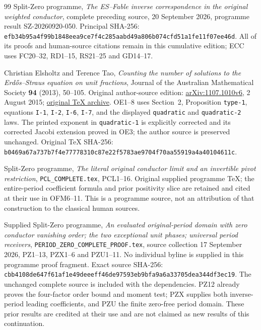\documentclass[11pt]{article}
\begin{document}
\begin{thebibliography}{99}
 Split-Zero programme,
\emph{The ES--Fable inverse correspondence in the original weighted
conductor}, complete preceding source, 20 September 2026,
programme result SZ-20260920-050. Principal SHA-256:
\texttt{efb34b95a4f99b1848eea9ce7f4c285aabd49a806b074cfd51a1fe11f07ee46d}.
All of its proofs and human-source citations remain in this cumulative
edition; ECC uses FC20--32, RD1--15, RS21--25 and GD14--17.


 Christian Elsholtz and Terence Tao,
\emph{Counting the number of solutions to the Erd\H{o}s--Straus
equation on unit fractions}, Journal of the Australian Mathematical
Society \textbf{94} (2013), 50--105. Original author-source edition:
\href{https://arxiv.org/abs/1107.1010v6}{arXiv:1107.1010v6},
2 August 2015; \href{https://arxiv.org/src/1107.1010v6}{original TeX archive}.
OE1--8 uses Section~2, Proposition \texttt{type-1}, equations
\texttt{I-1}, \texttt{I-2}, \texttt{I-6}, \texttt{I-7},
and the displayed \texttt{quadratic} and \texttt{quadratic-2} laws.
The printed exponent in \texttt{quadratic-1} is explicitly corrected
and its corrected Jacobi extension proved in OE3; the author source
is preserved unchanged. Original TeX SHA-256:
\texttt{b0469a67a737b7f4e77778310c87e22f5783ae9704f70aa55919a4a40104611c}.


 Split-Zero programme,
\emph{The literal original conductor limit and an invertible pivot restriction},
\texttt{PCL\_COMPLETE.tex}, PCL1--16. Original supplied programme TeX;
the entire-period coefficient formula and prior positivity slice are
retained and cited at their use in OFM6--11. This is a programme source,
not an attribution of that construction to the classical human sources.


 Supplied Split-Zero programme,
\emph{An evaluated original-period domain with zero conductor vanishing
order; the two exceptional unit phases; universal period receivers},
\texttt{PERIOD\_ZERO\_COMPLETE\_PROOF.tex}, source collection
17 September 2026, PZ1--13, PZX1--6 and PZU1--11.
No individual byline is supplied in this programme proof fragment.
Exact source SHA-256:
\texttt{cbb4108de647f61af1e49deeeff46de97593eb9bfa9a6a33705dea344df3ec19}.
The unchanged complete source is included with the dependencies.
PZ12 already proves the four-factor order bound and moment test;
PZX supplies both inverse-period leading coefficients, and PZU the
finite zero-free period domain. These prior results are credited
at their use and are not claimed as new results of this continuation.



\end{thebibliography}
\end{document}
